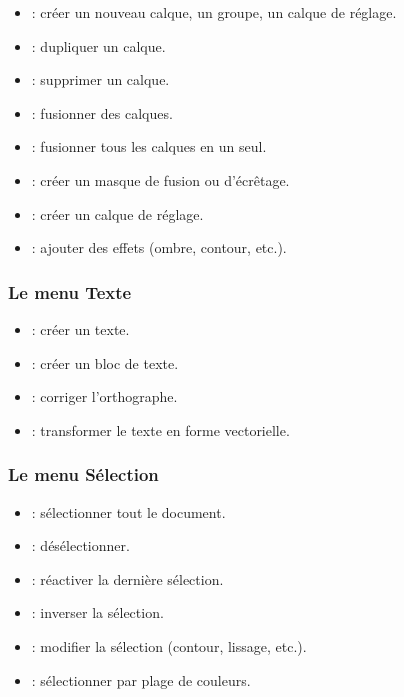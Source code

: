 \begin{itemize}
    \item {} : créer un nouveau calque, un groupe, un calque de réglage.
    \item {} : dupliquer un calque.
    \item {} : supprimer un calque.
    \item {} : fusionner des calques.
    \item {} : fusionner tous les calques en un seul.
    \item {} : créer un masque de fusion ou d'écrêtage.
    \item {} : créer un calque de réglage.
    \item {} : ajouter des effets (ombre, contour, etc.).
\end{itemize}

\subsubsection{Le menu Texte}

\begin{itemize}
    \item {} : créer un texte.
    \item {} : créer un bloc de texte.
    \item {} : corriger l'orthographe.
    \item {} : transformer le texte en forme vectorielle.
\end{itemize}

\subsubsection{Le menu Sélection}

\begin{itemize}
    \item {} : sélectionner tout le document.
    \item {} : désélectionner.
    \item {} : réactiver la dernière sélection.
    \item {} : inverser la sélection.
    \item {} : modifier la sélection (contour, lissage, etc.).
    \item {} : sélectionner par plage de couleurs.
\end{itemize}

